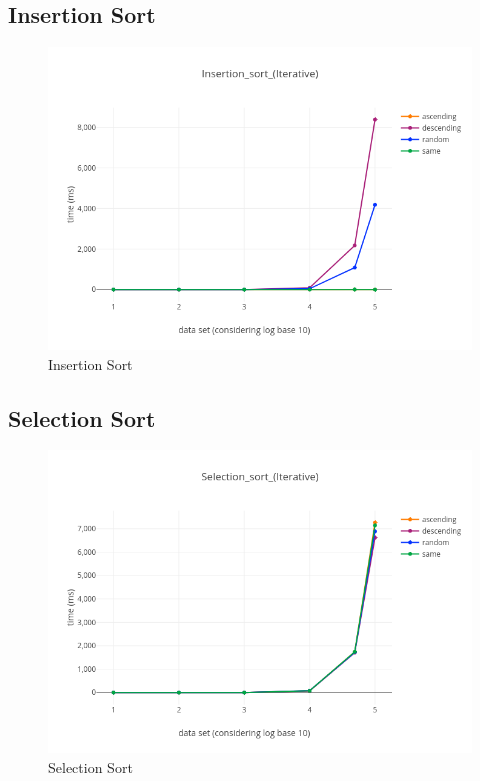 \documentclass[paper=letter, fontsize=12pt]{article}
\begin{document}
\subsection{Insertion Sort}
\begin{figure}[H]
	\centering
	\includegraphics[scale=0.75]{../analysis/Insertion_sort_(Iterative).png}
	\caption{Insertion Sort}
\end{figure}

\subsection{Selection Sort}
\begin{figure}[H]
	\centering
	\includegraphics[scale=0.75]{../analysis/Selection_sort_(Iterative).png}
	\caption{Selection Sort}
\end{figure}
\end{document}
